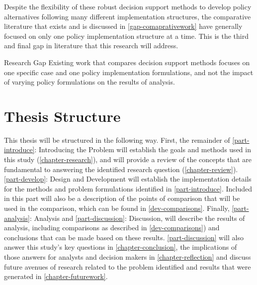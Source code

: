 Despite the flexibility of these robust decision support methods to develop policy alternatives following many different implementation structures, the comparative literature that exists and is discussed in \cref{gap-comaprativework} have generally focused on only one policy implementation structure at a time. This is the third and final gap in literature that this research will address.

\begin{researchbox}{Research Gap \thegapcounter}\label{gaptwo}
    Existing work that compares decision support methods focuses on one specific case and one policy implementation formulations, and not the impact of varying policy formulations on the results of analysis.
\end{researchbox}

\section{Thesis Structure}
This thesis will be structured in the following way. First, the remainder of \cref{part-introduce}: Introducing the Problem will establish the goals and methods used in this study (\cref{chapter-research}), and will provide a review of the concepts that are fundamental to answering the identified research question (\cref{chapter-review}). \cref{part-develop}: Design and Development will establish the implementation details for the methods and problem formulations identified in \cref{part-introduce}. Included in this part will also be a description of the points of comparison that will be used in the comparison, which can be found in \cref{dev-comparisons}. Finally, \cref{part-analysis}: Analysis and \cref{part-discussion}: Discussion, will describe the results of analysis, including comparisons as described in \cref{dev-comparisons}) and conclusions that can be made based on these results. \cref{part-discussion} will also answer this study's key questions in \cref{chapter-conclusion}, the implications of those answers for analysts and decision makers in \cref{chapter-reflection} and discuss future avenues of research related to the problem identified and results that were generated in \cref{chapter-futurework}. 
